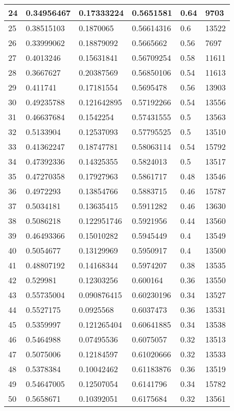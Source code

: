 \begin{longtable}{|l|l|l|l|l|l|}
24 & 0.34956467 & 0.17333224 & 0.5651581 & 0.64 & 9703 \\ \hline 
25 & 0.38515103 & 0.1870065 & 0.56614316 & 0.6 & 13522 \\ \hline 
26 & 0.33999062 & 0.18879092 & 0.5665662 & 0.56 & 7697 \\ \hline 
27 & 0.4013246 & 0.15631841 & 0.56709254 & 0.58 & 11611 \\ \hline 
28 & 0.3667627 & 0.20387569 & 0.56850106 & 0.54 & 11613 \\ \hline 
29 & 0.411741 & 0.17181554 & 0.5695478 & 0.56 & 13903 \\ \hline 
30 & 0.49235788 & 0.121642895 & 0.57192266 & 0.54 & 13556 \\ \hline 
31 & 0.46637684 & 0.1542254 & 0.57431555 & 0.5 & 13563 \\ \hline 
32 & 0.5133904 & 0.12537093 & 0.57795525 & 0.5 & 13510 \\ \hline 
33 & 0.41362247 & 0.18747781 & 0.58063114 & 0.54 & 15792 \\ \hline 
34 & 0.47392336 & 0.14325355 & 0.5824013 & 0.5 & 13517 \\ \hline 
35 & 0.47270358 & 0.17927963 & 0.5861717 & 0.48 & 13546 \\ \hline 
36 & 0.4972293 & 0.13854766 & 0.5883715 & 0.46 & 15787 \\ \hline 
37 & 0.5034181 & 0.13635415 & 0.5911282 & 0.46 & 13630 \\ \hline 
38 & 0.5086218 & 0.122951746 & 0.5921956 & 0.44 & 13560 \\ \hline 
39 & 0.46493366 & 0.15010282 & 0.5945449 & 0.4 & 13549 \\ \hline 
40 & 0.5054677 & 0.13129969 & 0.5950917 & 0.4 & 13500 \\ \hline 
41 & 0.48807192 & 0.14168344 & 0.5974207 & 0.38 & 13535 \\ \hline 
42 & 0.529981 & 0.12303256 & 0.600164 & 0.36 & 13550 \\ \hline 
43 & 0.55735004 & 0.090876415 & 0.60230196 & 0.34 & 13527 \\ \hline 
44 & 0.5527175 & 0.0925568 & 0.6037473 & 0.36 & 13531 \\ \hline 
45 & 0.5359997 & 0.121265404 & 0.60641885 & 0.34 & 13538 \\ \hline 
46 & 0.5464988 & 0.07495536 & 0.6075057 & 0.32 & 13513 \\ \hline 
47 & 0.5075006 & 0.12184597 & 0.61020666 & 0.32 & 13533 \\ \hline 
48 & 0.5378384 & 0.10042462 & 0.61183876 & 0.36 & 13519 \\ \hline 
49 & 0.54647005 & 0.12507054 & 0.6141796 & 0.34 & 15782 \\ \hline 
50 & 0.5658671 & 0.10392051 & 0.6175684 & 0.32 & 13561 \\ \hline 
\end{longtable}